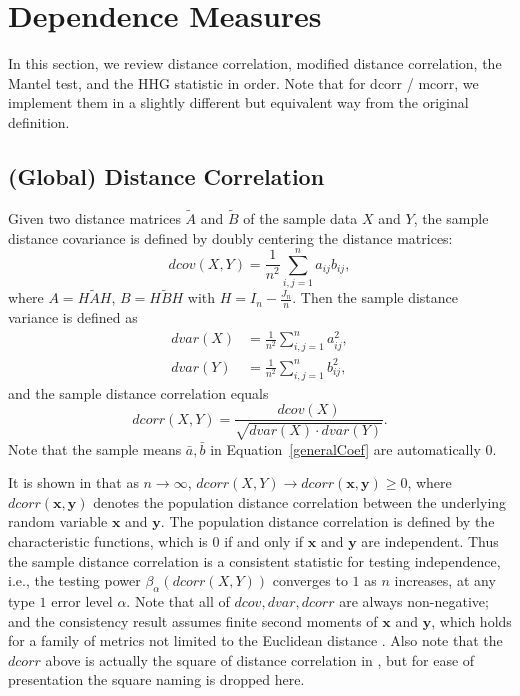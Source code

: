 \documentclass[11pt]{article}
\providecommand{\mb}[1]{\boldsymbol{#1}}
\begin{document}
\section{Dependence Measures}
\label{appen:methods}

In this section, we review distance correlation, modified distance correlation, the Mantel test, and the HHG statistic in order. Note that for dcorr / mcorr, we implement them in a slightly different but equivalent way from the original definition.

\subsection{(Global) Distance Correlation}
\label{appen:dcorr}
Given two distance matrices $\tilde{A}$ and $\tilde{B}$ of the sample data $X$ and $Y$, the sample distance covariance is defined by doubly centering the distance matrices:
\begin{equation}
\label{dcovEqu}
dcov(X,Y)=\frac{1}{n^2}\sum_{i,j=1}^{n}a_{ij}b_{ij},
\end{equation}
where $A=H\tilde{A}H$, $B=H\tilde{B}H$ with $H=I_{n}-\frac{J_{n}}{n}$. Then the sample distance variance is defined as
\begin{align*}
dvar(X) &=\frac{1}{n^2}\sum_{i,j=1}^{n}a_{ij}^{2},\\
dvar(Y) &=\frac{1}{n^2}\sum_{i,j=1}^{n}b_{ij}^{2},
\end{align*}
and the sample distance correlation equals
\begin{equation}
\label{dcorrEqu}
dcorr(X,Y)=\frac{dcov(X)}{\sqrt{dvar(X) \cdot dvar(Y)}}.
\end{equation}
Note that the sample means $\bar{a}, \bar{b}$ in Equation~\ref{generalCoef} are automatically $0$.

It is shown in \cite{SzekelyRizzoBakirov2007} that as $n \rightarrow \infty$, $dcorr(X,Y) \rightarrow dcorr(\mb{x},\mb{y}) \geq 0$, where $dcorr(\mb{x},\mb{y})$ denotes the population distance correlation between the underlying random variable $\mb{x}$ and $\mb{y}$. The population distance correlation is defined by the characteristic functions, which is $0$ if and only if $\mb{x}$ and $\mb{y}$ are independent. Thus the sample distance correlation is a consistent statistic for testing independence, i.e., the testing power $\beta_{\alpha}(dcorr(X,Y))$ converges to $1$ as $n$ increases, at any type $1$ error level $\alpha$. Note that all of $dcov, dvar, dcorr$ are always non-negative; and the consistency result assumes finite second moments of $\mb{x}$ and $\mb{y}$, which holds for a family of metrics not limited to the Euclidean distance \cite{Lyons2013}. Also note that the $dcorr$ above is actually the square of distance correlation in \cite{SzekelyRizzoBakirov2007}, but for ease of presentation the square naming is dropped here.
\end{document}
